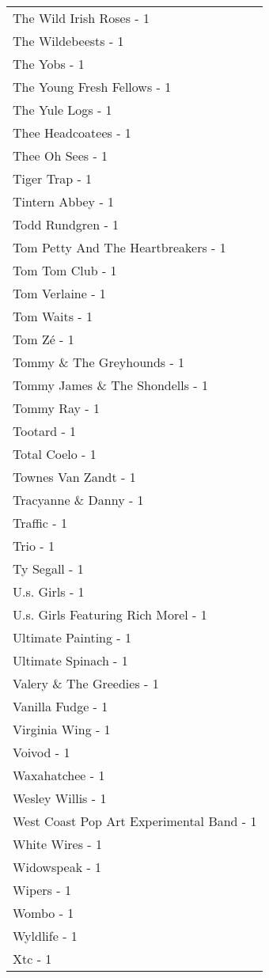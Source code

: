 \documentclass[
]{article}
\begin{document}
\begin{longtable}{l}
The Wild Irish Roses - 1 \\ 
The Wildebeests - 1 \\ 
The Yobs - 1 \\ 
The Young Fresh Fellows - 1 \\ 
The Yule Logs - 1 \\ 
Thee Headcoatees - 1 \\ 
Thee Oh Sees - 1 \\ 
Tiger Trap - 1 \\ 
Tintern Abbey - 1 \\ 
Todd Rundgren - 1 \\ 
Tom Petty And The Heartbreakers - 1 \\ 
Tom Tom Club - 1 \\ 
Tom Verlaine - 1 \\ 
Tom Waits - 1 \\ 
Tom Zé - 1 \\ 
Tommy \& The Greyhounds - 1 \\ 
Tommy James \& The Shondells - 1 \\ 
Tommy Ray - 1 \\ 
Tootard - 1 \\ 
Total Coelo - 1 \\ 
Townes Van Zandt - 1 \\ 
Tracyanne \& Danny - 1 \\ 
Traffic - 1 \\ 
Trio - 1 \\ 
Ty Segall - 1 \\ 
U.s. Girls - 1 \\ 
U.s. Girls Featuring Rich Morel - 1 \\ 
Ultimate Painting - 1 \\ 
Ultimate Spinach - 1 \\ 
Valery \& The Greedies - 1 \\ 
Vanilla Fudge - 1 \\ 
Virginia Wing - 1 \\ 
Voivod - 1 \\ 
Waxahatchee - 1 \\ 
Wesley Willis - 1 \\ 
West Coast Pop Art Experimental Band - 1 \\ 
White Wires - 1 \\ 
Widowspeak - 1 \\ 
Wipers - 1 \\ 
Wombo - 1 \\ 
Wyldlife - 1 \\ 
Xtc - 1 \\ 

\end{longtable}
\end{document}
